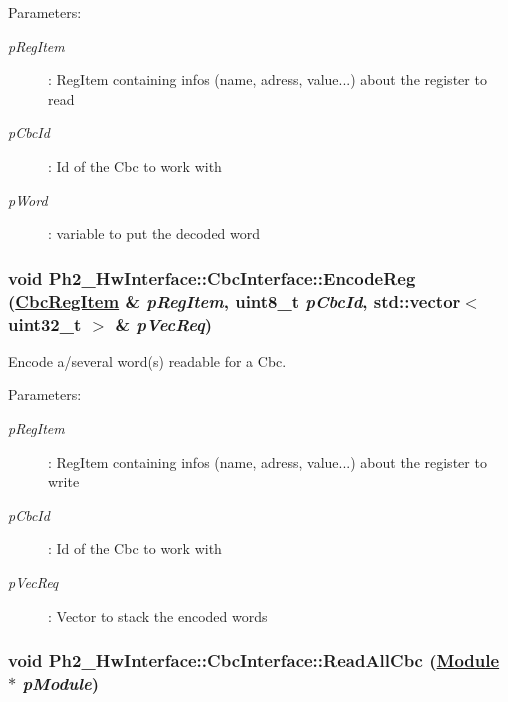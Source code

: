 \begin{Desc}
\item[Parameters:]
\begin{description}
\item[{\em p\-Reg\-Item}]: Reg\-Item containing infos (name, adress, value...) about the register to read \item[{\em p\-Cbc\-Id}]: Id of the Cbc to work with \item[{\em p\-Word}]: variable to put the decoded word \end{description}
\end{Desc}
\hypertarget{class_ph2___hw_interface_1_1_cbc_interface_673d4cba39ab42870573baf00800dd62}{
\subsubsection[EncodeReg]{\setlength{\rightskip}{0pt plus 5cm}void Ph2\_\-Hw\-Interface::Cbc\-Interface::Encode\-Reg (\hyperlink{struct_ph2___hw_description_1_1_cbc_reg_item}{Cbc\-Reg\-Item} \& {\em p\-Reg\-Item}, uint8\_\-t {\em p\-Cbc\-Id}, std::vector$<$ uint32\_\-t $>$ \& {\em p\-Vec\-Req})}}
\label{class_ph2___hw_interface_1_1_cbc_interface_673d4cba39ab42870573baf00800dd62}


Encode a/several word(s) readable for a Cbc. 

\begin{Desc}
\item[Parameters:]
\begin{description}
\item[{\em p\-Reg\-Item}]: Reg\-Item containing infos (name, adress, value...) about the register to write \item[{\em p\-Cbc\-Id}]: Id of the Cbc to work with \item[{\em p\-Vec\-Req}]: Vector to stack the encoded words \end{description}
\end{Desc}
\hypertarget{class_ph2___hw_interface_1_1_cbc_interface_5a2e404039cef52b294cacfa7e667f49}{
\subsubsection[ReadAllCbc]{\setlength{\rightskip}{0pt plus 5cm}void Ph2\_\-Hw\-Interface::Cbc\-Interface::Read\-All\-Cbc (\hyperlink{class_ph2___hw_description_1_1_module}{Module} $\ast$ {\em p\-Module})}}
\label{class_ph2___hw_interface_1_1_cbc_interface_5a2e404039cef52b294cacfa7e667f49}


